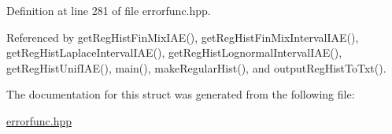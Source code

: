 \-Definition at line 281 of file errorfunc.\-hpp.



\-Referenced by get\-Reg\-Hist\-Fin\-Mix\-I\-A\-E(), get\-Reg\-Hist\-Fin\-Mix\-Interval\-I\-A\-E(), get\-Reg\-Hist\-Laplace\-Interval\-I\-A\-E(), get\-Reg\-Hist\-Lognormal\-Interval\-I\-A\-E(), get\-Reg\-Hist\-Unif\-I\-A\-E(), main(), make\-Regular\-Hist(), and output\-Reg\-Hist\-To\-Txt().



\-The documentation for this struct was generated from the following file\-:\begin{DoxyCompactItemize}
\item 
\hyperlink{errorfunc_8hpp}{errorfunc.\-hpp}\end{DoxyCompactItemize}
